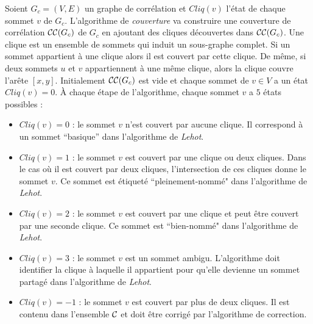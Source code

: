 Soient $G_c = (V,E)$ un graphe de corr\'elation et $Cliq(v)$ l'\'etat de chaque sommet $v$ de   $G_c$.
L'algorithme de {\em couverture} va construire une couverture de corr\'elation ${\cal CC}(G_c)$ de $G_c$ en ajoutant des cliques d\'ecouvertes dans ${\cal CC}(G_c)$.  
Une clique est un ensemble de sommets qui induit un sous-graphe complet. 
Si un sommet appartient \`a une clique alors il est couvert par cette clique. 
De m\^eme, si deux sommets $u$ et $v$ appartiennent \`a une m\^eme clique, alors la clique couvre l'ar\^ete $[x,y]$.
Initialement ${\cal CC}(G_c)$ est vide et chaque sommet de $v \in V$ a un \'etat $Cliq(v)=0$. 
\newline
\`A chaque \'etape de l'algorithme, chaque sommet $v$ a $5$ \'etats possibles :
\begin{itemize}
	\item $Cliq(v)=0$ : le sommet $v$ n'est couvert par aucune clique. Il correspond \`a un sommet ``basique'' dans l'algorithme de {\em Lehot}.
	\item $Cliq(v)=1$ : le sommet $v$ est couvert par une clique ou deux cliques. Dans le cas o\`u il est couvert par deux cliques, l'intersection de ces cliques donne le sommet $v$. Ce sommet est \'etiquet\'e ``pleinement-nomm\'e" dans l'algorithme de {\em Lehot}.
	\item $Cliq(v) = 2$ : le sommet $v$ est couvert par une clique et peut \^etre couvert par une seconde clique. Ce sommet est ``bien-nomm\'e" dans l'algorithme de {\em Lehot}.
	\item $Cliq(v) = 3$ : le sommet $v$ est un sommet ambigu. L'algorithme doit identifier la clique \`a laquelle il appartient pour qu'elle devienne un sommet partag\'e dans l'algorithme de {\em Lehot}.
	\item $Cliq(v) = -1$ :  le sommet $v$ est couvert par plus de deux cliques. Il est contenu dans l'ensemble $\cal C$ et doit \^etre corrig\'e par l'algorithme de correction.
\end{itemize}

